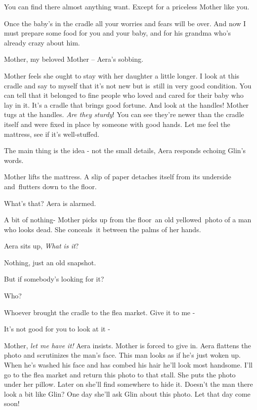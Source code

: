 \documentclass[twoside,11pt]{book}
\begin{document}
{\textquotedbl}You can find there almost anything want. Except for a priceless Mother like you.{\textquotedbl} 

{\textquotedbl}Once the baby's in the cradle all your worries and fears will be over. And now I must prepare some food
for you and your baby, and for his grandma who's already crazy about him.{\textquotedbl} 

{\textquotedbl}Mother, my beloved Mother --{\textquotedbl} Aera{}'s  sobbing. ~

Mother feels she ought to stay with her daughter a little longer. {\textquotedbl}I look at this cradle and say to myself
that it's not new but is{\ }still in very good condition. You can tell that it belonged to fine people
who loved and cared for their baby who lay in it. It's a cradle that brings good fortune. And look at the
handles!{\textquotedbl} Mother tugs at the handles. {\textquotedbl}\textit{Are they sturdy}! You can see they're newer
than the cradle itself and were fixed in place by someone with good hands. Let me feel the mattress, see if it's
well-stuffed.{\textquotedbl} 

{\textquotedbl}The main thing is the idea - not the small details,{\textquotedbl} Aera responds echoing Glin's words. 

Mother lifts the mattress. A slip of paper detaches itself from its underside and{\ }flutters down to the
floor. 

{\textquotedbl}What's that?{\textquotedbl} Aera is alarmed. 

A bit of nothing-{\textquotedbl} Mother picks up from the floor~an old yellowed\ photo of a man who looks dead. She
conceals{\ }it between the palms of her hands. 

Aera sits up, {\textquotedbl}\textit{What is it}?{\textquotedbl}~ 

{\textquotedbl}Nothing, just an old snapshot.{\textquotedbl} 

{\textquotedbl}But if somebody's looking for it?{\textquotedbl} 

{\textquotedbl}Who?{\textquotedbl} 

{\textquotedbl}Whoever brought the cradle to the flea market. Give it to me -{\textquotedbl} 

{\textquotedbl}It's not good for you to look at it -{\textquotedbl} 

{\textquotedbl}Mother, \textit{let me have it!}{\textquotedbl} Aera insists. Mother is forced to give in. Aera flattens
the photo and scrutinizes the man's face. {\textquotedbl}This man looks as if he's just woken up. When he's washed his
face and has combed his hair he'll look most handsome. I'll go to the flea market and return this photo to that
stall.{\textquotedbl} She puts the photo under her pillow. Later on she'll find somewhere to hide it. Doesn't the man
there look a bit like Glin? One day she'll ask Glin about this photo.  Let that day come soon!
\end{document}
